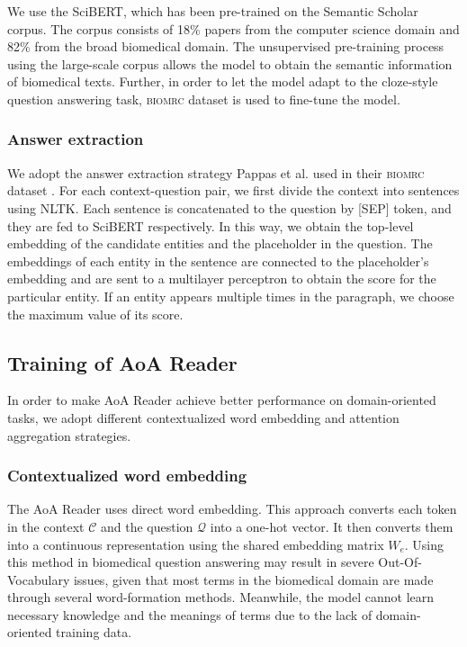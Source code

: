 \documentclass[sigconf, screen]{acmart}
\newcommand{\biomrc}{{\scshape{biomrc}}\xspace}
\newcommand{\scibert}{Sci\-BERT\xspace}
\newcommand{\aoa}{AoA Reader\xspace}
\begin{document}
We use the \scibert \cite{beltagySciBERTPretrainedLanguage2019}, which has been pre-trained on the Semantic Scholar corpus. The corpus consists of 18\% papers from the computer science domain and 82\% from the broad biomedical domain. The unsupervised pre-training process using the large-scale corpus allows the model to obtain the semantic information of biomedical texts. Further, in order to let the model adapt to the cloze-style question answering task, \biomrc dataset is used to fine-tune the model.

\subsubsection{Answer extraction}

We adopt the answer extraction strategy Pappas et al. used in their \biomrc dataset \cite{pappasBioMRCDatasetBiomedical2020}. For each context-question pair, we first divide the context into sentences using NLTK\cite{birdNLTKNaturalLanguage2004}. Each sentence is concatenated to the question by [SEP] token, and they are fed to \scibert respectively. In this way, we obtain the top-level embedding of the candidate entities and the placeholder in the question. The embeddings of each entity in the sentence are connected to the placeholder's embedding and are sent to a multilayer perceptron to obtain the score for the particular entity. If an entity appears multiple times in the paragraph, we choose the maximum value of its score.

\subsection{Training of \aoa}

In order to make \aoa \cite{cuiAttentionoverAttentionNeuralNetworks2017} achieve better performance on domain-oriented tasks, we adopt different contextualized word embedding and attention aggregation strategies.

\subsubsection{Contextualized word embedding}

The \aoa uses direct word embedding. This approach converts each token in the context $\mathcal{C}$ and the question $\mathcal{Q}$ into a one-hot vector. It then converts them into a continuous representation using the shared embedding matrix $W_e$. Using this method in biomedical question answering may result in severe Out-Of-Vocabulary issues, given that most terms in the biomedical domain are made through several word-formation methods. Meanwhile, the model cannot learn necessary knowledge and the meanings of terms due to the lack of domain-oriented training data.
\end{document}
